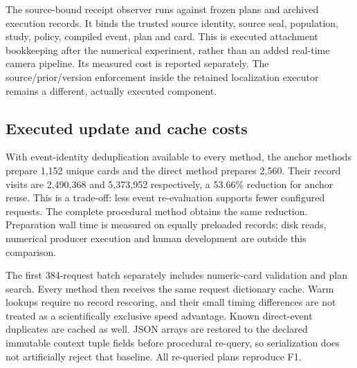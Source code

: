The source-bound receipt observer runs against frozen plans and archived execution records. It binds the trusted source identity, source seal, population, study, policy, compiled event, plan and card. This is executed attachment bookkeeping after the numerical experiment, rather than an added real-time camera pipeline. Its measured cost is reported separately. The source/prior/version enforcement inside the retained localization executor remains a different, actually executed component.

\subsection{Executed update and cache costs}

With event-identity deduplication available to every method, the anchor methods prepare 1,152 unique cards and the direct method prepares 2,560. Their record visits are 2,490,368 and 5,373,952 respectively, a 53.66\% reduction for anchor reuse. This is a trade-off: less event re-evaluation supports fewer configured requests. The complete procedural method obtains the same reduction. Preparation wall time is measured on equally preloaded records; disk reads, numerical producer execution and human development are outside this comparison.

The first 384-request batch separately includes numeric-card validation and plan search. Every method then receives the same request dictionary cache. Warm lookups require no record rescoring, and their small timing differences are not treated as a scientifically exclusive speed advantage. Known direct-event duplicates are cached as well. JSON arrays are restored to the declared immutable context tuple fields before procedural re-query, so serialization does not artificially reject that baseline. All re-queried plans reproduce F1.


